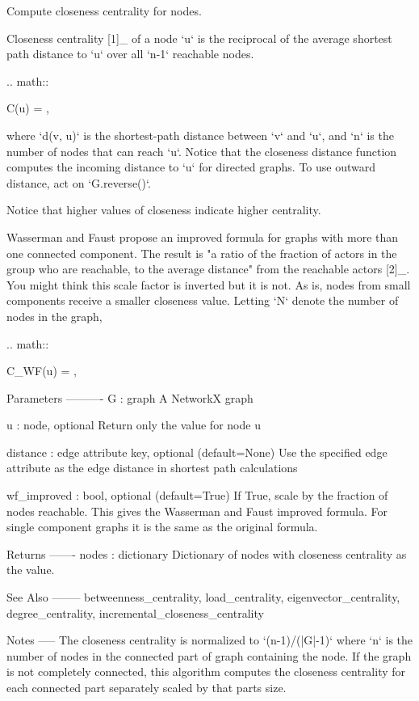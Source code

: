 \begin{DoxyVerb}Compute closeness centrality for nodes.

Closeness centrality [1]_ of a node `u` is the reciprocal of the
average shortest path distance to `u` over all `n-1` reachable nodes.

.. math::

    C(u) = ,

where `d(v, u)` is the shortest-path distance between `v` and `u`,
and `n` is the number of nodes that can reach `u`. Notice that the
closeness distance function computes the incoming distance to `u`
for directed graphs. To use outward distance, act on `G.reverse()`.

Notice that higher values of closeness indicate higher centrality.

Wasserman and Faust propose an improved formula for graphs with
more than one connected component. The result is "a ratio of the
fraction of actors in the group who are reachable, to the average
distance" from the reachable actors [2]_. You might think this
scale factor is inverted but it is not. As is, nodes from small
components receive a smaller closeness value. Letting `N` denote
the number of nodes in the graph,

.. math::

    C_{WF}(u) =  ,

Parameters
----------
G : graph
  A NetworkX graph

u : node, optional
  Return only the value for node u

distance : edge attribute key, optional (default=None)
  Use the specified edge attribute as the edge distance in shortest
  path calculations

wf_improved : bool, optional (default=True)
  If True, scale by the fraction of nodes reachable. This gives the
  Wasserman and Faust improved formula. For single component graphs
  it is the same as the original formula.

Returns
-------
nodes : dictionary
  Dictionary of nodes with closeness centrality as the value.

See Also
--------
betweenness_centrality, load_centrality, eigenvector_centrality,
degree_centrality, incremental_closeness_centrality

Notes
-----
The closeness centrality is normalized to `(n-1)/(|G|-1)` where
`n` is the number of nodes in the connected part of graph
containing the node.  If the graph is not completely connected,
this algorithm computes the closeness centrality for each
connected part separately scaled by that parts size.


\end{DoxyVerb}
